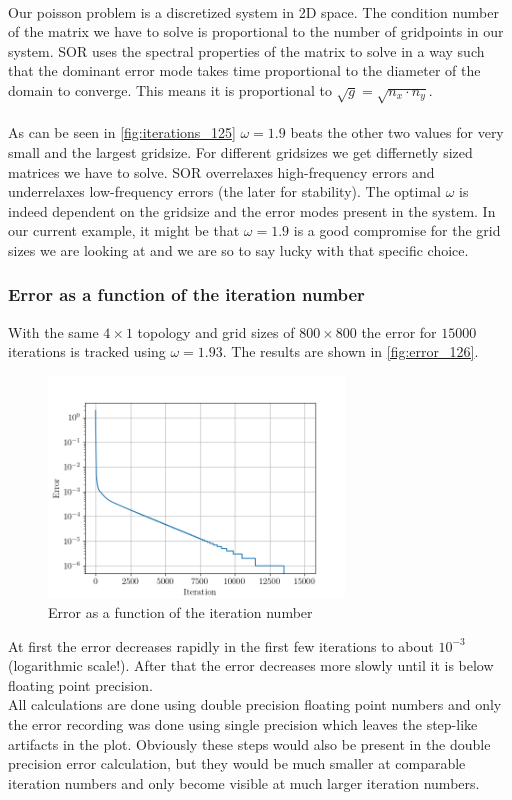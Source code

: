\\
Our poisson problem is a discretized system in 2D space. The condition number of the matrix we have to solve is proportional to the number of gridpoints in our system. SOR uses the spectral properties of the matrix to solve in a way such that the dominant error mode takes time proportional to the diameter of the domain to converge. This means it is proportional to $\sqrt{g} = \sqrt{n_x \cdot n_y}$.\\

\\
As can be seen in \autoref{fig:iterations_125} $\omega = 1.9$ beats the other two values for very small and the largest gridsize. For different gridsizes we get differnetly sized matrices we have to solve. SOR overrelaxes high-frequency errors and underrelaxes low-frequency errors (the later for stability). The optimal $\omega$ is indeed dependent on the gridsize and the error modes present in the system. In our current example, it might be that $\omega = 1.9$ is a good compromise for the grid sizes we are looking at and we are so to say lucky with that specific choice. 

\subsubsection{Error as a function of the iteration number}
With the same $4 \times 1$ topology and grid sizes of $800 \times 800$ the error for $15000$ iterations is tracked using $\omega = 1.93$. The results are shown in \autoref{fig:error_126}.
\begin{figure}[H]
    \centering
    \includegraphics[width=0.7\textwidth]{../fig/lab1/errors_126.png}
    \caption{Error as a function of the iteration number}
    \label{fig:error_126}
\end{figure}
At first the error decreases rapidly in the first few iterations to about $10^{-3}$ (logarithmic scale!). After that the error decreases more slowly until it is below floating point precision.\\ 
 All calculations are done using double precision floating point numbers and only the error recording was done using single precision which leaves the step-like artifacts in the plot. Obviously these steps would also be present in the double precision error calculation, but they would be much smaller at comparable iteration numbers and only become visible at much larger iteration numbers. 

